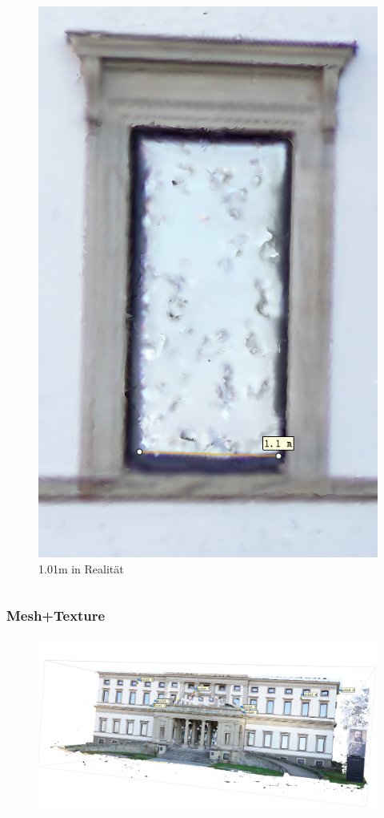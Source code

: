 \documentclass{beamer}
\begin{document}
\begin{frame}
\begin{columns}
\begin{figure}
			\includegraphics[scale=0.35]{Skale1(In-Situ 1.01 m)}
			\caption{1.01m in Realität}
		\end{figure}
		
	\end{columns}
\end{frame}

	\begin{frame}
		\frametitle{Mesh+Texture}
		\begin{figure}[r]
			\includegraphics[width=12cm]{Mesh + Texture 1}
		\end{figure}
	\end{frame}
\end{document}

